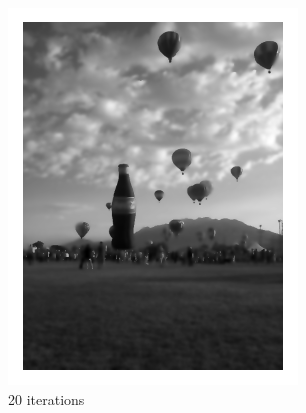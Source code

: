 \begin{figure}[ht]
\begin{minipage}[b]{0.45\linewidth}
\includegraphics[width=\textwidth]{figures/coke_balloon_20iters.pdf}
\caption*{20 iterations}
\end{minipage}
\hspace{0.5cm}
\begin{minipage}[b]{0.45\linewidth}
\centering

\end{minipage}
\end{figure}
